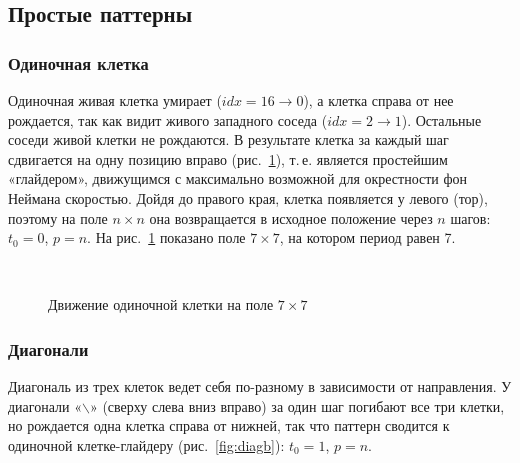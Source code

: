 \subsection{Простые паттерны}

\subsubsection*{Одиночная клетка}

Одиночная живая клетка умирает ($idx = 16 \to 0$), а клетка справа от нее рождается, так как видит живого западного соседа ($idx = 2 \to 1$). Остальные соседи живой клетки не рождаются. В результате клетка за каждый шаг сдвигается на одну позицию вправо (рис.~\ref{fig:single}), т.\,е. является простейшим «глайдером», движущимся с максимально возможной для окрестности фон Неймана скоростью. Дойдя до правого края, клетка появляется у левого (тор), поэтому на поле $n \times n$ она возвращается в исходное положение через $n$ шагов: $t_0 = 0$, $p = n$. На рис.~\ref{fig:single} показано поле $7 \times 7$, на котором период равен 7.

\begin{figure}[H]
	\centering
	\begin{minipage}{0.3\textwidth}\centering{}\end{minipage}
	\begin{minipage}{0.3\textwidth}\centering{}\end{minipage}
	\begin{minipage}{0.3\textwidth}\centering{}\end{minipage}\\[3mm]
	\begin{minipage}{0.24\textwidth}\centering{}\end{minipage}
	\begin{minipage}{0.24\textwidth}\centering{}\end{minipage}
	\begin{minipage}{0.48\textwidth}\centering{}\end{minipage}
	\caption{Движение одиночной клетки на поле $7 \times 7$}
	\label{fig:single}
\end{figure}

\subsubsection*{Диагонали}

Диагональ из трех клеток ведет себя по-разному в зависимости от направления. У диагонали «$\backslash$» (сверху слева вниз вправо) за один шаг погибают все три клетки, но рождается одна клетка справа от нижней, так что паттерн сводится к одиночной клетке-глайдеру (рис.~\ref{fig:diagb}): $t_0 = 1$, $p = n$.

